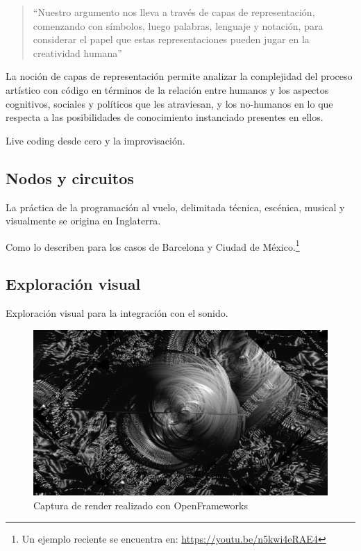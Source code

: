 \begin{quote}

  ``Nuestro argumento nos lleva a través de capas de representación, comenzando con símbolos, luego palabras, lenguaje y notación, para considerar el papel que estas representaciones pueden jugar en la creatividad humana'' \citep[p.~3]{McLean2011}

\end{quote}

  
La noción de capas de representación permite analizar la complejidad del proceso artístico con código en términos de la relación entre humanos y los aspectos cognitivos, sociales y políticos que les atraviesan, y los no-humanos en lo que respecta a las posibilidades de conocimiento instanciado presentes en ellos. 

Live coding desde cero y la improvisación. 

\subsection{Nodos y circuitos}

La práctica de la programación al vuelo, delimitada técnica, escénica, musical y visualmente se origina en Inglaterra. %

Como lo describen \cite{villasenor} para los casos de Barcelona y Ciudad de México.\footnote{Un ejemplo reciente se encuentra en: \url{https://youtu.be/n5kwi4eRAE4}} 

\subsection{Exploración visual}

Exploración visual para la integración con el sonido.  

\begin{figure}[tb]
\centering 
\includegraphics[width=\columnwidth]{img/of13.png} 
\caption[Openframeworks 1]{Captura de render realizado con OpenFrameworks} %
\label{fig:gallery} 
\end{figure}

